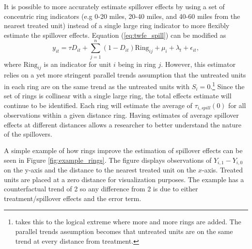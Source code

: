 \documentclass[11pt]{article}
\begin{document}
It is possible to more accurately estimate spillover effects by using a set of concentric ring indicators (e.g 0-20 miles, 20-40 miles, and 40-60 miles from the nearest treated unit) instead of a single large ring indicator to more flexibly estimate the spillover effects. Equation (\ref{eq:twfe_spill}) can be modified as 
\begin{equation}\label{eq:twfe_rings}    
    y_{it} = \tau D_{it} + \sum_{j=1}^n (1-D_{it}) \text{Ring}_{ij} + \mu_i + \lambda_t + \epsilon_{it},
\end{equation}
where $\text{Ring}_{ij}$ is an indicator for unit $i$ being in ring $j$. However, this estimator relies on a yet more stringent parallel trends assumption that the untreated units in each ring are on the same trend as the untreated units with $S_i = 0$.\footnote{\citet{Butts_2021} takes this to the logical extreme where more and more rings are added. The parallel trends assumption becomes that untreated units are on the same trend at every distance from treatment.} Since the set of rings is collinear with a single large ring, the total effects estimate will continue to be identified. Each ring will estimate the average of $\tau_{i,spill}(0)$ for all observations within a given distance ring. Having estimates of average spillover effects at different distances allows a researcher to better understand the nature of the spillovers.

A simple example of how rings improve the estimation of spillover effects can be seen in Figure \ref{fig:example_rings}. The figure displays observations of $Y_{i,1} - Y_{i,0}$ on the y-axis and the distance to the nearest treated unit on the $x$-axis. Treated units are placed at a zero distance for visualization purposes. The example has a counterfactual trend of 2 so any difference from 2 is due to either treatment/spillover effects and the error term. 
\end{document}
